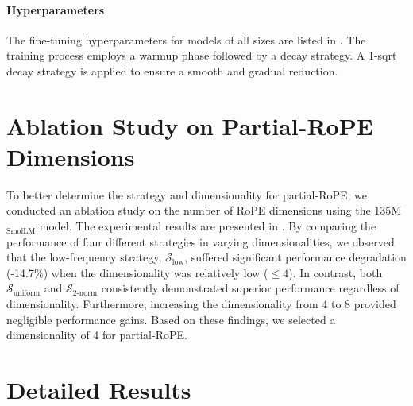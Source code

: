 \paragraph{Hyperparameters}



The fine-tuning hyperparameters for models of all sizes are listed in . The training process employs a warmup phase followed by a decay strategy. A 1-sqrt decay strategy is applied to ensure a smooth and gradual reduction.



\section{Ablation Study on Partial-RoPE Dimensions}
\label{app:pe-dim}



To better determine the strategy and dimensionality for partial-RoPE, we conducted an ablation study on the number of RoPE dimensions using the 135M$_{\text{SmolLM}}$ model. The experimental results are presented in . By comparing the performance of four different strategies in varying dimensionalities, we observed that the low-frequency strategy, $\mathcal{S}_{\text{low}}$, suffered significant performance degradation (-14.7\%) when the dimensionality was relatively low ($\leq 4$). In contrast, both $\mathcal{S}_{\text{uniform}}$ and $\mathcal{S}_{\text{2-norm}}$ consistently demonstrated superior performance regardless of dimensionality. Furthermore, increasing the dimensionality from 4 to 8 provided negligible performance gains. Based on these findings, we selected a dimensionality of 4 for partial-RoPE.


\section{Detailed Results}
\label{app:other_lb}






